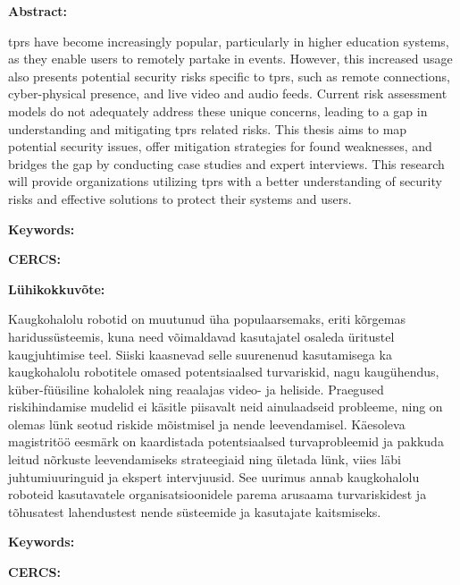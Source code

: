 
\newpage
\noindent\textbf{\large {\thesisTitle}}

\vspace*{3ex}

\noindent\textbf{Abstract:}
\vspace{-1ex}

\ac{tprs} have become increasingly popular, particularly
in higher education systems, as they enable users to remotely partake in
events. However, this increased usage also presents potential security risks
specific to \ac{tprs}, such as remote connections, cyber-physical presence, and
live video and audio feeds. Current risk assessment models do not adequately
address these unique concerns, leading to a gap in understanding and
mitigating \ac{tprs} related risks.
This thesis aims to map potential security issues, offer mitigation strategies for found weaknesses, and bridges the gap by
conducting case
studies and expert interviews.
This research will provide organizations utilizing \ac{tprs} with a
better understanding of security risks and effective solutions to protect
their systems and users.

\vspace*{1ex}

\noindent\textbf{Keywords:}
\vspace{-1ex}
{\thesisKeywordsEng}
\vspace*{1ex}

\noindent\textbf{CERCS:}
\vspace{-1ex}
{\thesisCERCSEng}
\vspace*{1ex}

\noindent\textbf{\large {\thesisTitleEst}}
\vspace*{1ex}

\noindent\textbf{Lühikokkuvõte:}
\vspace{-1ex}

Kaugkohalolu robotid on muutunud üha populaarsemaks, eriti kõrgemas haridussüsteemis, kuna need võimaldavad kasutajatel osaleda üritustel
kaugjuhtimise teel. Siiski kaasnevad selle suurenenud kasutamisega ka kaugkohalolu robotitele omased potentsiaalsed turvariskid, nagu
kaugühendus, küber-füüsiline kohalolek ning reaalajas video- ja heliside. Praegused riskihindamise mudelid ei käsitle
piisavalt neid ainulaadseid probleeme, ning on olemas lünk seotud riskide mõistmisel ja nende leevendamisel.
Käesoleva magistritöö eesmärk on kaardistada potentsiaalsed turvaprobleemid ja pakkuda leitud nõrkuste leevendamiseks strateegiaid ning
ületada lünk, viies läbi juhtumiuuringuid ja ekspert intervjuusid. See uurimus annab kaugkohalolu roboteid kasutavatele organisatsioonidele
parema arusaama turvariskidest ja tõhusatest lahendustest nende süsteemide ja kasutajate kaitsmiseks.
\vspace*{1ex}

\noindent\textbf{Keywords:}
\vspace{-1ex}
{\thesisKeywordsEst}
\vspace*{1ex}

\noindent\textbf{CERCS:}
\vspace{-1ex}
{\thesisCERCSEst}
